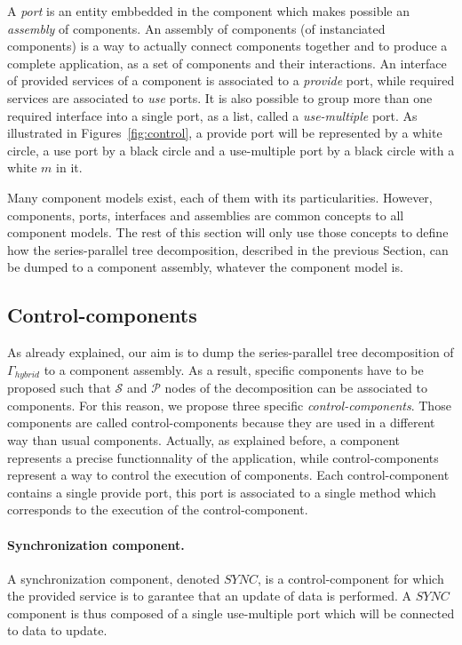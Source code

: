 A \emph{port} is an entity embbedded in the component which makes possible an \emph{assembly} of components. An assembly of components (of instanciated components) is a way to actually connect components together and to produce a complete application, as a set of components and their interactions. An interface of provided services of a component is associated to a \emph{provide} port, while required services are associated to \emph{use} ports. It is also possible to group more than one required interface into a single port, as a list, called a \emph{use-multiple} port. As illustrated in Figures~\ref{fig:control}, a provide port will be represented by a white circle, a use port by a black circle and a use-multiple port by a black circle with a white $m$ in it.

Many component models exist, each of them with its particularities. However, components, ports, interfaces and assemblies are common concepts to all component models. The rest of this section will only use those concepts to define how the series-parallel tree decomposition, described in the previous Section, can be dumped to a component assembly, whatever the component model is.

\subsection{Control-components}
As already explained, our aim is to dump the series-parallel tree decomposition of $\Gamma_{hybrid}$ to a component assembly. As a result, specific components have to be proposed such that $\mathcal{S}$ and $\mathcal{P}$ nodes of the decomposition can be associated to components. For this reason, we propose three specific \emph{control-components}. Those components are called control-components because they are used in a different way than usual components. Actually, as explained before, a component represents a precise functionnality of the application, while control-components represent a way to control the execution of components. Each control-component contains a single provide port, this port is associated to a single method which corresponds to the execution of the control-component.

\paragraph{Synchronization component.} A synchronization component, denoted $SYNC$, is a control-component for which the provided service is to garantee that an update of data is performed. A $SYNC$ component is thus composed of a single use-multiple port which will be connected to data to update.

